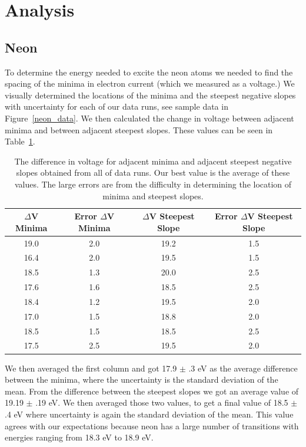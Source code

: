 \documentclass[prb,preprint]{revtex4-1}
\begin{document}
\section{Analysis}

\subsection{Neon}

To determine the energy needed to excite the neon atoms we needed to find the spacing of the minima in electron current (which we measured as a voltage.) We visually determined the locations of the minima and the steepest negative slopes with uncertainty for each of our data runs, see sample data in Figure~\ref{neon_data}. We then calculated the change in voltage between adjacent minima and between adjacent steepest slopes. These values can be seen in Table~\ref{neon_dvs}.

\begin{table}[h!]
\centering
\caption{The difference in voltage for adjacent minima and adjacent steepest negative slopes obtained from all of data runs. Our best value is the average of these values. The large errors are from the difficulty in determining the location of minima and steepest slopes.}
\begin{ruledtabular}
\begin{tabular}{c c c c}
$\Delta$V Minima & Error $\Delta$V Minima & $\Delta$V Steepest Slope &  Error $\Delta$V Steepest Slope\\
\hline	%
19.0 & 2.0 & 19.2 & 1.5  \\
16.4 & 2.0 & 19.5 & 1.5  \\
18.5 & 1.3 & 20.0 & 2.5  \\
17.6 & 1.6 & 18.5 & 2.5  \\
18.4 & 1.2 & 19.5 & 2.0  \\
17.0 & 1.5 & 18.8 & 2.0  \\
18.5 & 1.5 & 18.5 & 2.5  \\
17.5 & 2.5 & 19.5 & 2.0  \\

\end{tabular}
\end{ruledtabular}
\label{neon_dvs}
\end{table}

We then averaged the first column and got 17.9 $\pm$ .3 eV as the average difference between the minima, where the uncertainty is the standard deviation of the mean. From the difference between the steepest slopes we got an average value of 19.19 $\pm$ .19 eV. We then averaged those two values, to get a final value of 18.5 $\pm$ .4 eV where uncertainty is again the standard deviation of the mean. This value agrees with our expectations because neon has a large number of transitions with energies ranging from 18.3 eV to 18.9 eV.
\end{document}
